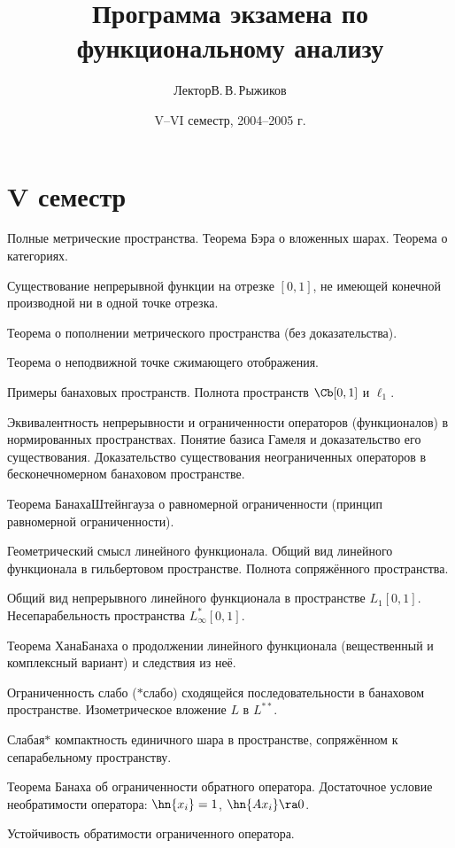 \documentclass[a4paper]{article}
\title{Программа экзамена по функциональному анализу}
\author{Лектор\т В.\,В.\,Рыжиков}
\date{V--VI семестр, 2004--2005 г.}
\begin{document}
\maketitle

\section*{V семестр}

\begin{nums}{-2}
\item Полные метрические пространства. Теорема Бэра о вложенных шарах. Теорема о категориях.
\item Существование непрерывной функции на отрезке $[0,1]$, не имеющей конечной производной
      ни в одной точке отрезка.
\item Теорема о пополнении метрического пространства (без доказательства).
\item Теорема о неподвижной точке сжимающего отображения.
\item Примеры банаховых пространств. Полнота пространств $\Cb[0,1]$ и $\ell_1$.
\item Эквивалентность непрерывности и ограниченности операторов (функционалов) в
нормированных пространствах. Понятие базиса Гамеля и доказательство его
существования. Доказательство существования неограниченных операторов в
бесконечномерном банаховом пространстве.
\item Теорема Банаха\ч Штейнгауза о равномерной ограниченности (принцип равномерной
ограниченности).
\item Геометрический смысл линейного функционала. Общий вид линейного функционала
в гильбертовом пространстве. Полнота сопряжённого пространства.
\item Общий вид непрерывного линейного функционала в пространстве $L_1[0,1]$.
Несепарабельность пространства $L_{\infty}^*[0,1]$.
\item Теорема Хана\ч Банаха о продолжении линейного функционала (вещественный и
комплексный вариант) и следствия из неё.
\item Ограниченность слабо ($*$\д слабо) сходящейся последовательности в банаховом
пространстве. Изометрическое вложение $L$ в $L^{**}$.
\item Слабая\д $*$ компактность единичного шара в пространстве,
сопряжённом к сепарабельному пространству.
\item Теорема Банаха об ограниченности обратного оператора. Достаточное условие
необратимости оператора: $\hn{x_i} = 1$, $\hn{Ax_i} \ra 0$.
\item Устойчивость обратимости ограниченного оператора.

\end{nums}
\end{document}
